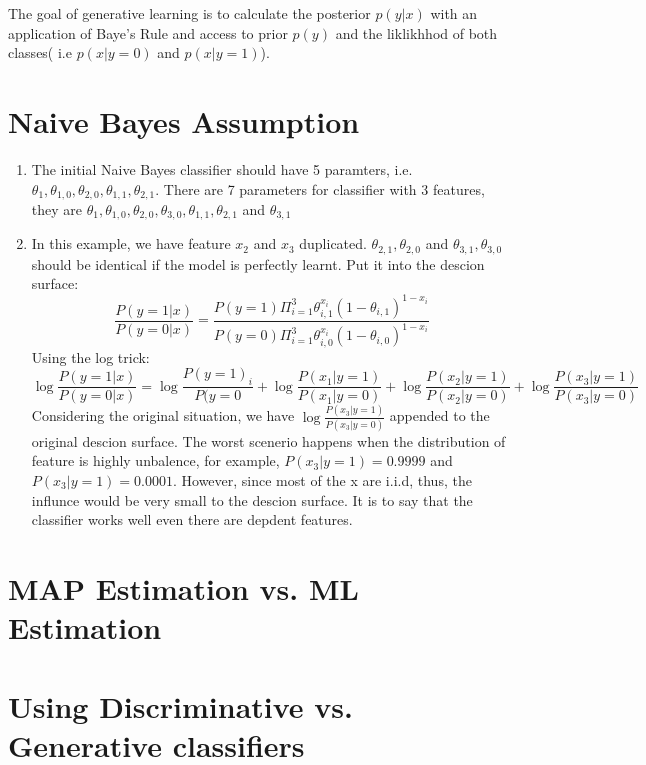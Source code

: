 \documentclass[a4paper, 12pt, titlepage]{article}
\begin{document}
The goal of generative learning is to calculate the posterior $p(y|x)$ with an application of Baye's Rule and access to prior $p(y)$ and the liklikhhod of both classes( i.e $p(x|y=0)$ and $p(x|y=1)$).

\section{Naive Bayes Assumption}

\begin{enumerate}
    \item The initial Naive Bayes classifier should have 5 paramters, i.e. $\theta_1, \theta_{1,0}, \theta_{2, 0}, \theta_{1, 1}, \theta_{2, 1}$. There are 7 parameters for classifier with 3 features, they are $\theta_1, \theta_{1,0}, \theta_{2, 0},\theta_{3, 0}, \theta_{1, 1}, \theta_{2, 1}$ and $\theta_{3, 1}$
    \item In this example, we have feature $x_2$ and $x_3$ duplicated. $\theta_{2,1}, \theta_{2,0}$ and $\theta_{3,1}, \theta_{3,0}$ should be identical if the model is perfectly learnt. Put it into the descion surface:
        $$\frac{P(y=1|x)}{P(y=0|x)}=\frac{P(y=1)\Pi^3_{i=1}\theta^{x_i}_{i,1}(1-\theta_{i,1})^{1-x_i}}{P(y=0)\Pi^3_{i=1}\theta^{x_i}_{i,0}(1-\theta_{i,0})^{1-x_i}}$$
        Using the log trick:
        $$\log{\frac{P(y=1|x)}{P(y=0|x)}}=\log{\frac{P(y=1)_i}{P(y=0}} + \log{\frac{P(x_1|y=1)}{P(x_1|y=0)}}+\log{\frac{P(x_2|y=1)}{P(x_2|y=0)}}+\log{\frac{P(x_3|y=1)}{P(x_3|y=0)}}$$
        Considering the original situation, we have $\log{\frac{P(x_3|y=1)}{P(x_3|y=0)}}$ appended to the original descion surface. The worst scenerio happens when the distribution of feature is highly unbalence, for example, $P(x_3|y=1) = 0.9999$ and $P(x_3|y=1) = 0.0001$. However, since most of the x are i.i.d, thus, the influnce would be very small to the descion surface. It is to say that the classifier works well even there are depdent features.

\end{enumerate}

\section{MAP Estimation vs. ML Estimation}

\section{Using Discriminative vs. Generative classifiers}
\end{document}
